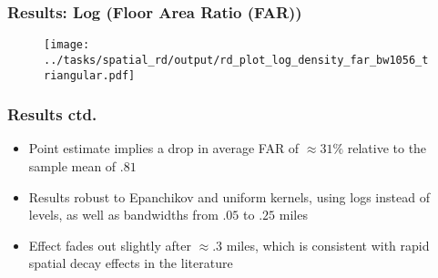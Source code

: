 \begin{frame}[t,label=far-main]
    \frametitle{Results: Log (Floor Area Ratio (FAR))} 
        \begin{figure}
            \centering
            \texttt{[image: ../tasks/spatial\_rd/output/rd\_plot\_log\_density\_far\_bw1056\_triangular.pdf]}
            \label{fig:spatial_rd_log_far}
        \end{figure}
        \vfill\hfill
    \hyperlink{levels}{}
    \hspace{0.2em}
    \hyperlink{lapu}{}
    \hspace{0.2em}
    \hyperlink{bcr}{}
    \hspace{0.2em}
    \hyperlink{lps}{}
    \hspace{0.2em}
 \end{frame} 

 \begin{frame}
    \frametitle{Results ctd.} 
        \begin{itemize}
            \item Point estimate implies a drop in average FAR of $\approx 31\%$ relative to the sample mean of $.81$
            \item Results robust to Epanchikov and uniform kernels, using logs instead of levels, as well as bandwidths from $.05$ to $.25$ miles
            \item Effect fades out slightly after $\approx .3$ miles, which is consistent with rapid spatial decay effects in the literature \scriptsize{\cite{baum-snow_local_2024}}
        \end{itemize}
 \end{frame} 


